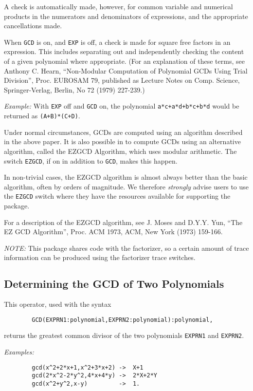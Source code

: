 A check is automatically made, however, for common variable and numerical
products in the numerators and denominators of expressions, and the
appropriate cancellations made.

When {\tt GCD} is on, and {\tt EXP} is off, a check is made for square
free factors in an expression.  This includes separating out and
independently checking the content of a given polynomial where
appropriate. (For an explanation of these terms, see Anthony C. Hearn,
``Non-Modular Computation of Polynomial GCDs Using Trial Division'', Proc.
EUROSAM 79, published as Lecture Notes on Comp.  Science, Springer-Verlag,
Berlin, No 72 (1979) 227-239.)

{\it Example:} With {\tt EXP} off and {\tt GCD}
on,
the polynomial {\tt a*c+a*d+b*c+b*d} would be returned as {\tt (A+B)*(C+D)}.

Under normal circumstances, GCDs are computed using an algorithm described
in the above paper. It is also possible in {\REDUCE} to compute GCDs using
an alternative algorithm, called the EZGCD Algorithm, which uses modular
arithmetic.  The switch {\tt EZGCD}, if on in addition to
{\tt GCD}, makes this happen.

In non-trivial cases, the EZGCD algorithm is almost always better
than the basic algorithm, often by orders of magnitude.  We therefore
{\em strongly\/} advise users to use the {\tt EZGCD} switch where they have the
resources available for supporting the package.

For a description of the EZGCD algorithm, see J. Moses and D.Y.Y. Yun,
``The EZ GCD Algorithm'', Proc. ACM 1973, ACM, New York (1973) 159-166.

{\it NOTE:}
This package shares code with the factorizer, so a certain amount of trace
information can be produced using the factorizer trace switches.

\subsection{Determining the GCD of Two Polynomials}
This operator, used with the syntax
\begin{verbatim}
        GCD(EXPRN1:polynomial,EXPRN2:polynomial):polynomial,
\end{verbatim}
returns the greatest common divisor of the two polynomials {\tt EXPRN1} and
{\tt EXPRN2}.

{\it Examples:}
\begin{verbatim}
        gcd(x^2+2*x+1,x^2+3*x+2) ->  X+1
        gcd(2*x^2-2*y^2,4*x+4*y) ->  2*X+2*Y
        gcd(x^2+y^2,x-y)         ->  1.
\end{verbatim}

